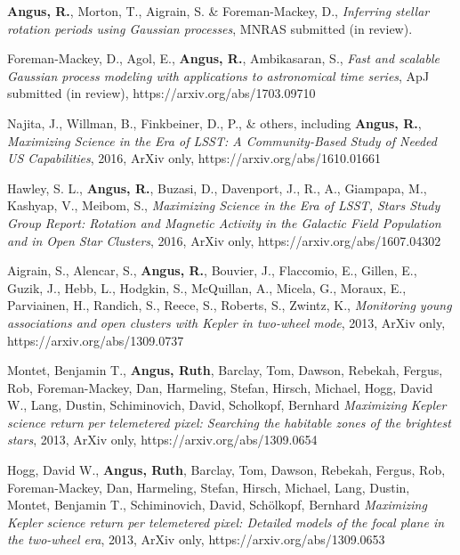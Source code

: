 \documentclass[12pt,letterpaper]{article}
\begin{document}
\begin{list}{}{\cvlist}
\item
    {\bf Angus, R.}, Morton, T., Aigrain, S. \& Foreman-Mackey, D., {\it
    Inferring stellar rotation periods using Gaussian processes}, MNRAS
    submitted (in review).
\item
    Foreman-Mackey, D., Agol, E., {\bf Angus, R.}, Ambikasaran, S., {\it Fast
    and scalable Gaussian process modeling with applications to astronomical
    time series}, ApJ submitted (in review), https://arxiv.org/abs/1703.09710
\item
    Najita, J., Willman, B., Finkbeiner, D., P., \& others, including {\bf
    Angus, R.}, {\it Maximizing Science in the Era of LSST: A Community-Based
    Study of Needed US Capabilities}, 2016, ArXiv only,
    https://arxiv.org/abs/1610.01661
\item
    Hawley, S. L., {\bf Angus, R.}, Buzasi, D., Davenport, J., R., A.,
    Giampapa, M., Kashyap, V., Meibom, S., {\it Maximizing Science in the Era
    of LSST, Stars Study Group Report: Rotation and Magnetic Activity in the
    Galactic Field Population and in Open Star Clusters}, 2016, ArXiv only,
    https://arxiv.org/abs/1607.04302
\item
    Aigrain, S., Alencar, S., {\bf Angus, R.}, Bouvier, J., Flaccomio, E.,
    Gillen, E., Guzik, J., Hebb, L., Hodgkin, S., McQuillan, A., Micela, G.,
    Moraux, E., Parviainen, H., Randich, S., Reece, S., Roberts, S.,
    Zwintz, K., {\it Monitoring young associations and open clusters with
    Kepler in two-wheel mode}, 2013, ArXiv only,
    https://arxiv.org/abs/1309.0737
\item
    Montet, Benjamin T., {\bf Angus, Ruth}, Barclay, Tom, Dawson, Rebekah,
    Fergus, Rob, Foreman-Mackey, Dan, Harmeling, Stefan, Hirsch, Michael,
    Hogg, David W., Lang, Dustin, Schiminovich, David, Scholkopf, Bernhard
    {\it Maximizing Kepler science return per telemetered pixel: Searching the
    habitable zones of the brightest stars}, 2013, ArXiv only,
    https://arxiv.org/abs/1309.0654
\item
    Hogg, David W., {\bf Angus, Ruth}, Barclay, Tom, Dawson, Rebekah, Fergus,
    Rob, Foreman-Mackey, Dan, Harmeling, Stefan, Hirsch, Michael, Lang,
    Dustin, Montet, Benjamin T., Schiminovich, David, Schölkopf, Bernhard {\it
    Maximizing Kepler science return per telemetered pixel: Detailed models of
    the focal plane in the two-wheel era}, 2013, ArXiv only,
    https://arxiv.org/abs/1309.0653
\end{list}

%     

%     
\end{document}
